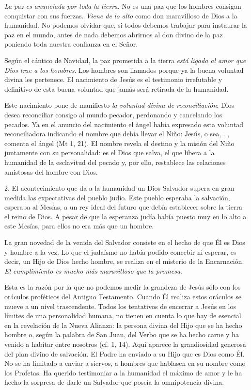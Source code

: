 \emph{La paz es anunciada por toda la tierra}. No es una paz que los hombres consigan conquistar con sus fuerzas. \emph{Viene de lo alto} como don maravilloso de Dios a la humanidad. No podemos olvidar que, si todos debemos trabajar para instaurar la paz en el mundo, antes de nada debemos abrirnos al don divino de la paz poniendo toda nuestra confianza en el Señor.

Según el cántico de Navidad, la paz prometida a la tierra \emph{está ligada al amor que Dios trae a los hombres}. Los hombres son llamados  porque ya la buena voluntad divina les pertenece. El nacimiento de Jesús es el testimonio irrefutable y definitivo de esta buena voluntad que jamás será retirada de la humanidad.

Este nacimiento pone de manifiesto \emph{la voluntad divina de reconciliación}: Dios desea reconciliar consigo al mundo pecador, perdonando y cancelando los pecados. Ya en el anuncio del nacimiento el ángel había expresado esta voluntad reconciliadora indicando el nombre que debía llevar el Niño: Jesús, o sea, . , comenta el ángel (Mt 1, 21). El nombre revela el destino y la misión del Niño juntamente con su personalidad: es el Dios que salva, el que libera a la humanidad de la esclavitud del pecado y, por ello, restablece las relaciones amistosas del hombre con Dios.

2. El acontecimiento que da a la humanidad un Dios Salvador supera en gran medida las expectativas del pueblo judío. Este pueblo esperaba la salvación, esperaba al Mesías, a un rey ideal del futuro que debía establecer sobre la tierra el reino de Dios. A pesar de que la esperanza judía había puesto muy en lo alto a este Mesías, para ellos no era más que un hombre.

La gran novedad de la venida del Salvador consiste en el hecho de que Él es Dios y hombre a la vez. Lo que el judaísmo no había podido concebir ni esperar, es decir, un Hijo de Dios hecho hombre, se realiza en el misterio de la Encarnación. \emph{El cumplimiento es mucho más maravilloso que la promesa}.

Esta es la razón por la que no podemos medir la grandeza de Jesús sólo con los oráculos proféticos del Antiguo Testamento. Cuando Él realiza estos oráculos se mueve a un nivel trascendente. Todos los tentativos de encerrar a Jesús en los límites de una personalidad humana, no tienen en cuenta lo que hay de esencial en la revelación de la Nueva Alianza: la persona divina del Hijo que se ha hecho hombre o, según la palabra de San Juan, del Verbo que se ha hecho carne y ha venido a habitar entre nosotros (cf. 1, 14). Aquí aparece la grandiosidad generosa del plan divino de salvación. El Padre ha enviado a su Hijo que es Dios como Él. No se ha limitado a enviar a siervos, a hombres que hablasen en su nombre como los Profetas. Ha querido testimoniar a la humanidad el máximo de amor y le ha hecho la sorpresa de darle un Salvador que poseía la omnipotencia divina.

